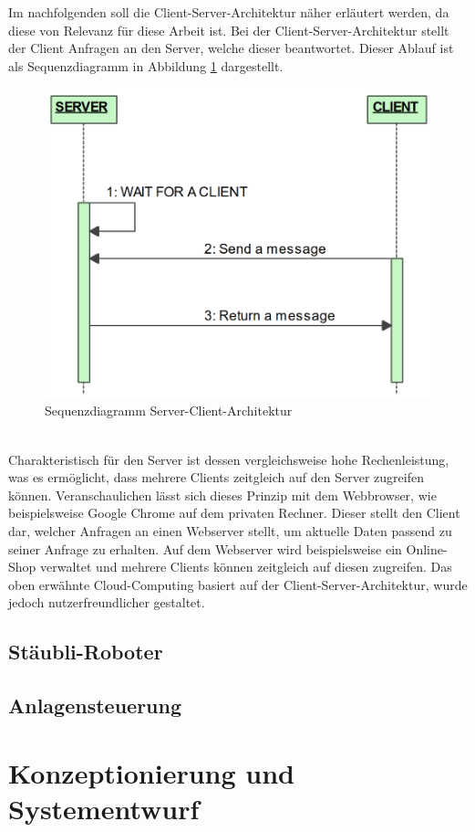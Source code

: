 \documentclass[ a4paper,
                oneside,
                toc=bibliography,
                toc=listof
                ]{scrbook}
\begin{document}
   	Im nachfolgenden soll die Client-Server-Architektur näher erläutert werden, da diese von Relevanz für diese Arbeit ist.
   	Bei der Client-Server-Architektur stellt der Client Anfragen an den Server, welche dieser beantwortet. Dieser Ablauf ist als Sequenzdiagramm in Abbildung \ref{fig:Sequenz Server-Client} dargestellt.\\
   	\begin{figure}[!ht]
   		\centering
   		\includegraphics[width=0.50\linewidth]{./images/Sequenzdiagramm_Server_Client.png}
   		\caption{Sequenzdiagramm Server-Client-Architektur \cite{CS9_TCP}} 
   		\label{fig:Sequenz Server-Client}
   	\end{figure} \\   	
   	Charakteristisch für den Server ist dessen vergleichsweise hohe Rechenleistung, was es ermöglicht, dass mehrere Clients zeitgleich auf den Server zugreifen können. Veranschaulichen lässt sich dieses Prinzip mit dem Webbrowser, wie beispielsweise Google Chrome auf dem privaten Rechner. Dieser stellt den Client dar, welcher Anfragen an einen Webserver stellt, um aktuelle Daten passend zu seiner Anfrage zu erhalten. Auf dem Webserver wird beispielsweise ein Online-Shop verwaltet und mehrere Clients können zeitgleich auf diesen zugreifen. Das oben erwähnte Cloud-Computing basiert auf der Client-Server-Architektur, wurde jedoch nutzerfreundlicher gestaltet. \cite{IT-Sicherheit}
   	\\
   
   	\section{Stäubli-Roboter}
   	
   	\section{Anlagensteuerung}
   	
	\newpage
	\chapter{Konzeptionierung und Systementwurf}
\end{document}

